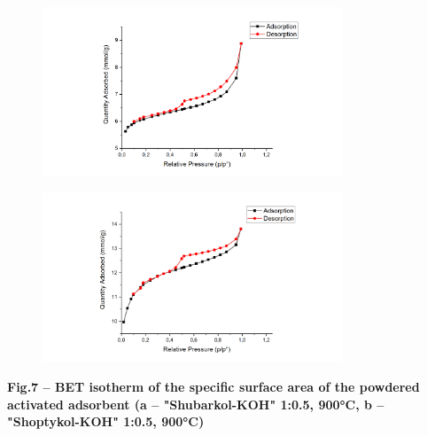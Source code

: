 \begin{figure}[H]
	\centering
	\includegraphics[width=0.8\textwidth]{media/chem2/image24}
	\caption*{}
\end{figure}

\begin{figure}[H]
	\centering
	\includegraphics[width=0.8\textwidth]{media/chem2/image25}
	\caption*{}
\end{figure}


{\bfseries Fig.7 -- BET isotherm of the specific surface area of the
powdered activated adsorbent (a -- "Shubarkol-KOH" 1:0.5, 900°C, b --
"Shoptykol-KOH" 1:0.5, 900°C)}

